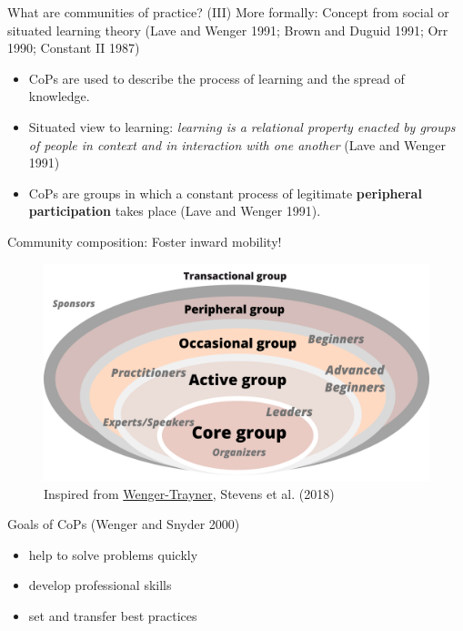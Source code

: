 \documentclass[
  ignorenonframetext,
]{beamer}
\begin{document}
\begin{frame}{What are communities of practice? (III)}
\protect\hypertarget{what-are-communities-of-practice-iii}{}
More formally: Concept from social or situated learning theory (Lave and
Wenger 1991; Brown and Duguid 1991; Orr 1990; Constant II 1987)

\begin{itemize}
\item
  CoPs are used to describe the process of learning and the spread of
  knowledge.
\item
  Situated view to learning: \emph{learning is a relational property
  enacted by groups of people in context and in interaction with one
  another} (Lave and Wenger 1991)
\item
  CoPs are groups in which a constant process of legitimate
  \textbf{peripheral participation} takes place (Lave and Wenger 1991).
\end{itemize}
\end{frame}

\begin{frame}{Community composition: Foster inward mobility!}
\protect\hypertarget{community-composition-foster-inward-mobility}{}
\begin{figure}
\centering
\includegraphics[width=1\textwidth,height=\textheight]{figs/1.png}
\caption{Inspired from
\href{https://wenger-trayner.com/project/levels-of-participation/}{Wenger-Trayner},
Stevens et al. (2018)}
\end{figure}
\end{frame}

\begin{frame}{Goals of CoPs}
\protect\hypertarget{goals-of-cops}{}
(Wenger and Snyder 2000)

\begin{itemize}
\item
  help to solve problems quickly \newline
\item
  develop professional skills \newline
\item
  set and transfer best practices
\end{itemize}
\end{frame}
\end{document}
